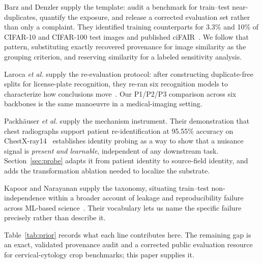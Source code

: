 \documentclass[conference]{IEEEtran}
\newcommand{\protocol}[1]{\textsf{#1}}
\begin{document}
Barz and Denzler supply the template: audit a benchmark for train--test near-duplicates, quantify the exposure, and release a corrected evaluation set rather than only a complaint.
They identified training counterparts for 3.3\% and 10\% of CIFAR-10 and CIFAR-100 test images and published ciFAIR~\cite{barz2020cifair}.
We follow that pattern, substituting exactly recovered provenance for image similarity as the grouping criterion, and reserving similarity for a labeled sensitivity analysis.

Laroca \emph{et al.} supply the re-evaluation protocol: after constructing duplicate-free splits for license-plate recognition, they re-ran six recognition models to characterize how conclusions move~\cite{laroca2023lpr}.
Our \protocol{P1}/\protocol{P2}/\protocol{P3} comparison across six backbones is the same manoeuvre in a medical-imaging setting.

Packh\"auser \emph{et al.} supply the mechanism instrument.
Their demonstration that chest radiographs support patient re-identification at 95.55\% accuracy on ChestX-ray14~\cite{packhauser2022reidentification} establishes identity probing as a way to show that a nuisance signal is \emph{present and learnable}, independent of any downstream task.
Section~\ref{sec:probe} adapts it from patient identity to source-field identity, and adds the transformation ablation needed to localize the substrate.

Kapoor and Narayanan supply the taxonomy, situating train--test non-independence within a broader account of leakage and reproducibility failure across ML-based science~\cite{kapoor2023leakage}.
Their vocabulary lets us name the specific failure precisely rather than describe it.

Table~\ref{tab:prior} records what each line contributes here.
The remaining gap is an exact, validated provenance audit and a corrected public evaluation resource for cervical-cytology crop benchmarks; this paper supplies it.
\end{document}

